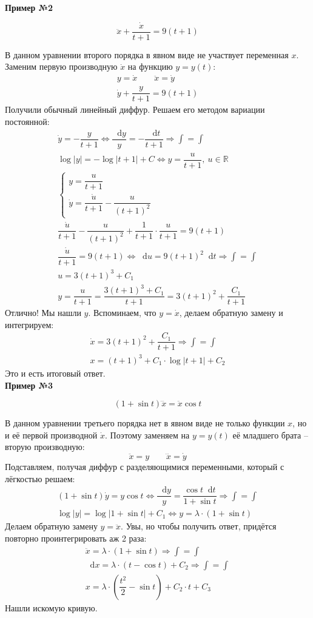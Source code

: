 \documentclass[a4paper,12pt]{article}
\newcommand{\R}{\mathbb{R}}
\renewcommand*\d{\mathop{}\!\mathrm{d}}
\newcommand{\dy}{\dot{y}}
\newcommand{\du}{\dot{u}}
\newcommand{\dx}{\dot{x}}
\newcommand{\ddx}{\ddot{x}}
\newcommand{\dddx}{\dddot{x}}
\newcommand{\bto}{\Longrightarrow}
\newcommand{\ds}{\displaystyle}
\begin{document}
\textbf{Пример №2}

\[\ddx + \dfrac{\dx}{t + 1} = 9(t + 1)\]

В данном уравнении второго порядка в явном виде не участвует переменная $x$. Заменим первую производную $\dx$ на функцию $y = y(t)$:
\begin{gather*}
	y = \dx\qquad \ddx = \dy\\
	\dy + \dfrac{y}{t + 1} = 9(t + 1)	
\end{gather*}
Получили обычный линейный диффур. Решаем его методом вариации постоянной:
\begin{gather*}
\dy = -\dfrac{y}{t + 1} \iff \dfrac{\d y}{y} = - \dfrac{\d t}{t + 1} \bto \ds\int = \int\\
\log|y| = - \log|t + 1| + C \iff y = \dfrac{u}{t + 1},\ u \in \R\\
\begin{cases}
	y = \dfrac{u}{t + 1}\\
	\dy = \dfrac{\du}{t + 1} - \dfrac{u}{(t + 1)^2} 
\end{cases}\\
\dfrac{\du}{t + 1} - \dfrac{u}{(t + 1)^2}+ \dfrac{1}{t + 1} \cdot \dfrac{u}{t + 1} = 9(t + 1) \\
\dfrac{\du}{t + 1} = 9(t + 1) \iff \d u = 9(t + 1)^2\d t \bto \ds\int = \int\\
u = 3(t + 1)^3 + C_1\\
y = \dfrac{u}{t + 1} = \dfrac{3(t + 1)^3 + C_1}{t + 1} = 3(t + 1)^2 + \dfrac{C_1}{t + 1}
\end{gather*}
Отлично! Мы нашли $y$. Вспоминаем, что $y = \dx$, делаем обратную замену и интегрируем:
\begin{gather*}
	\dx = 3(t + 1)^2 + \dfrac{C_1}{t + 1} \bto \ds\int = \ds\int\\
	x = (t + 1)^3 + C_1 \cdot \log|t + 1| + C_2
\end{gather*}
Это и есть итоговый ответ.
\ \\

\textbf{Пример №3}

\[(1 + \sin t)\dddx = \ddx \cos t\]

В данном уравнении третьего порядка нет в явном виде не только функции $x$, но и её первой производной $\dx$. Поэтому заменяем на $y = y(t)$ её младшего брата -- вторую производную:
\[\ddx = y \qquad \dddx = \dy\]
Подставляем, получая диффур с разделяющимися переменными, который с лёгкостью решаем:
\begin{gather*}
	(1 + \sin t)\dy = y \cos t \iff \dfrac{\d y}{y} = \dfrac{\cos t\d t}{1 + \sin t} \bto \ds\int = \int\\
	\log|y| = \log|1 + \sin t| + C_1 \iff y = \lambda \cdot (1 + \sin t)
\end{gather*}
Делаем обратную замену $y = \ddx$. Увы, но чтобы получить ответ, придётся повторно проинтегрировать аж 2 раза:
\begin{gather*}
	\ddx = \lambda \cdot (1 + \sin t) \bto \ds\int = \ds\int\\
	\d x = \lambda \cdot (t - \cos t) + C_2 \bto \ds\int = \ds\int \\
	x = \lambda \cdot \left(\dfrac{t^2}{2} - \sin t\right) + C_2\cdot t + C_3
\end{gather*}
Нашли искомую кривую.
\end{document}
